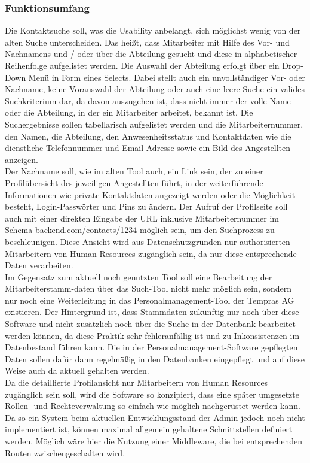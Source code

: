     \subsubsection{Funktionsumfang}
        Die Kontaktsuche soll, was die Usability anbelangt, sich möglichst wenig von der alten Suche unterscheiden. Das heißt, dass Mitarbeiter mit Hilfe des Vor- und Nachnamens und / oder über die Abteilung gesucht und diese in alphabetischer Reihenfolge aufgelistet werden. Die Auswahl der Abteilung erfolgt über ein Drop-Down Menü in Form eines Selects. Dabei stellt auch ein unvollständiger Vor- oder Nachname, keine Vorauswahl der Abteilung oder auch eine \glqq leere Suche\grqq{} ein valides Suchkriterium dar, da davon auszugehen ist, dass nicht immer der volle Name oder die Abteilung, in der ein Mitarbeiter arbeitet, bekannt ist. Die Suchergebnisse sollen tabellarisch aufgelistet werden und die Mitarbeiternummer, den Namen, die Abteilung, den Anwesenheitsstatus und Kontaktdaten wie die dienstliche Telefonnummer und Email-Adresse sowie ein Bild des Angestellten anzeigen.\\
        Der Nachname soll, wie im alten Tool auch, ein Link sein, der zu einer Profilübersicht des jeweiligen Angestellten führt, in der weiterführende Informationen wie private Kontaktdaten angezeigt werden oder die Möglichkeit besteht, Login-Passwörter und Pins zu ändern. Der Aufruf der Profilseite soll auch mit einer direkten Eingabe der URL inklusive Mitarbeiternummer im Schema \glqq backend.com/contacts/1234\grqq{} möglich sein, um den Suchprozess zu beschleunigen. Diese Ansicht wird aus Datenschutzgründen nur authorisierten Mitarbeitern von Human Resources zugänglich sein, da nur diese entsprechende Daten verarbeiten.\\
        Im Gegensatz zum aktuell noch genutzten Tool soll eine Bearbeitung der Mitarbeiterstamm-daten über das Such-Tool nicht mehr möglich sein, sondern nur noch eine Weiterleitung in das Personalmanagement-Tool der Tempras AG existieren. Der Hintergrund ist, dass Stammdaten zukünftig nur noch über diese Software und nicht zusätzlich noch über die Suche in der Datenbank bearbeitet werden können, da diese Praktik sehr fehleranfällig ist und zu Inkonsistenzen im Datenbestand führen kann. Die in der Personalmanagement-Software gepflegten Daten sollen dafür dann regelmäßig in den Datenbanken eingepflegt und auf diese Weise auch da aktuell gehalten werden.\\
        Da die detaillierte Profilansicht nur Mitarbeitern von Human Resources zugänglich sein soll, wird die Software so konzipiert, dass eine später umgesetzte Rollen- und Rechteverwaltung so einfach wie möglich nachgerüstet werden kann. Da so ein System beim aktuellen Entwicklungsstand der Admin jedoch noch nicht implementiert ist, können maximal allgemein gehaltene Schnittstellen definiert werden. Möglich wäre hier die Nutzung einer Middleware, die bei entsprechenden Routen zwischengeschalten wird.

